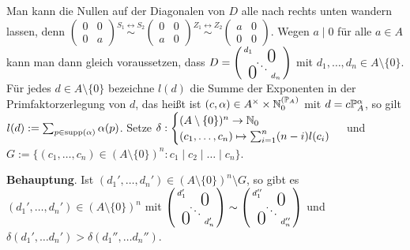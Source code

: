\documentclass[../../main.tex]{subfiles}
\begin{document}
\begin{cproof}
    Man kann die Nullen auf der Diagonalen von $D$ alle nach rechts unten wandern lassen, denn $\begin{pmatrix*}0&0\\ 0&a\end{pmatrix*}\stackrel{S_1\leftrightarrow S_2}{\sim}\begin{pmatrix*}0&0\\ a&0\end{pmatrix*}\stackrel{Z_1\leftrightarrow Z_2}{\sim}\begin{pmatrix*}a&0\\0&0\end{pmatrix*}$. Wegen $a\mid 0$ für alle $a\in A$ kann man dann gleich voraussetzen, dass $D= \left(
        \begin{smallmatrix}
            d_1 & & \llap{$\overset{\blap{\LARGE 0}}{~}$} \\
            & \ddots &\\
            \rlap{\tlap{\LARGE 0}} & & d_n
        \end{smallmatrix}
    \right)$ mit $d_1,\ldots ,d_n\in A\setminus\{0\}$. Für jedes $d\in A\setminus\{0\}$ bezeichne $l(d)$ die Summe der Exponenten in der Primfaktorzerlegung von $d$, das heißt ist $(c,\alpha)\in A^\times\times \expfam$ mit $d=c\P_A^\alpha$, so gilt $l(d):=\sum_{p\in\supp(\alpha)}\alpha(p)$. Setze $\delta:\begin{cases}(A\setminus\{0\})^n\to\N_0\\(c_1,\ldots ,c_n)\mapsto \sum_{i=1}^n(n-i)l(c_i)\end{cases}$ und $G:=\{(c_1,\ldots ,c_n)\in (A\setminus\{0\})^n: c_1\mid c_2\mid \ldots \mid c_n\}$.\\

    \begin{tcolorbox}[arc=0mm, boxrule=0.2mm]
        \noindent\textbf{Behauptung}. Ist $(d_1',\ldots ,d_n')\in (A\setminus\{0\})^n\setminus G$, so gibt es $(d_1',\ldots ,d_n')\in (A\setminus\{0\})^n$ mit $\left(
            \begin{smallmatrix}
                d'_1 & & \llap{$\overset{\blap{\LARGE 0}}{~}$} \\
                & \ddots &\\
                \rlap{\tlap{\LARGE 0}} & & d'_n
                \end{smallmatrix}\right)\sim \left(\begin{smallmatrix}
                d''_1 & & \llap{$\overset{\blap{\LARGE 0}}{~}$} \\
                & \ddots &\\
                \rlap{\tlap{\LARGE 0}} & & d''_n  
            \end{smallmatrix}
        \right)$ und $\delta(d_1',\ldots d_n')>\delta(d_1'',\ldots d_n'')$.\\


\end{tcolorbox}
\end{cproof}
\end{document}

